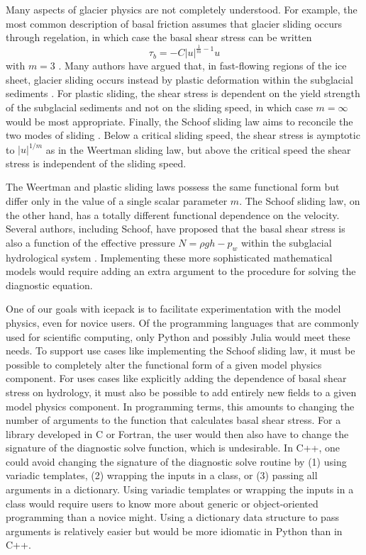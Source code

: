 \documentclass[journal abbreviation, manuscript]{copernicus}
\begin{document}
Many aspects of glacier physics are not completely understood.
For example, the most common description of basal friction assumes that glacier sliding occurs through regelation, in which case the basal shear stress can be written
\begin{equation}
    \tau_b = -C|u|^{\frac{1}{m} - 1}u
    \label{eq:weertman-sliding}
\end{equation}
with $m = 3$ \citep{weertman1957sliding}.
Many authors have argued that, in fast-flowing regions of the ice sheet, glacier sliding occurs instead by plastic deformation within the subglacial sediments \citep{tulaczyk2000basal}.
For plastic sliding, the shear stress is dependent on the yield strength of the subglacial sediments and not on the sliding speed, in which case $m = \infty$ would be most appropriate.
Finally, the Schoof sliding law aims to reconcile the two modes of sliding \citep{schoof2005effect}.
Below a critical sliding speed, the shear stress is aymptotic to $|u|^{1/m}$ as in the Weertman sliding law, but above the critical speed the shear stress is independent of the sliding speed.

The Weertman and plastic sliding laws possess the same functional form but differ only in the value of a single scalar parameter $m$.
The Schoof sliding law, on the other hand, has a totally different functional dependence on the velocity.
Several authors, including Schoof, have proposed that the basal shear stress is also a function of the effective pressure $N = \rho gh - p_w$ within the subglacial hydrological system \citep{budd1979empirical, schoof2005effect}.
Implementing these more sophisticated mathematical models would require adding an extra argument to the procedure for solving the diagnostic equation.

One of our goals with icepack is to facilitate experimentation with the model physics, even for novice users.
Of the programming languages that are commonly used for scientific computing, only Python and possibly Julia would meet these needs.
To support use cases like implementing the Schoof sliding law, it must be possible to completely alter the functional form of a given model physics component.
For uses cases like explicitly adding the dependence of basal shear stress on hydrology, it must also be possible to add entirely new fields to a given model physics component.
In programming terms, this amounts to changing the number of arguments to the function that calculates basal shear stress.
For a library developed in C or Fortran, the user would then also have to change the signature of the diagnostic solve function, which is undesirable.
In C++, one could avoid changing the signature of the diagnostic solve routine by (1) using variadic templates, (2) wrapping the inputs in a class, or (3) passing all arguments in a dictionary.
Using variadic templates or wrapping the inputs in a class would require users to know more about generic or object-oriented programming than a novice might.
Using a dictionary data structure to pass arguments is relatively easier but would be more idiomatic in Python than in C++.
\end{document}
